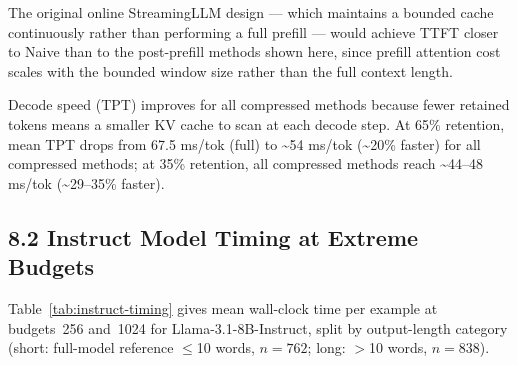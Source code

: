 \documentclass[10pt,letterpaper]{article}
\begin{document}
The original online StreamingLLM design --- which
maintains a bounded cache continuously rather than performing a full
prefill --- would achieve TTFT closer to Naive than to the post-prefill
methods shown here, since prefill attention cost scales with the bounded
window size rather than the full context length.

Decode speed (TPT) improves for all compressed methods because
fewer retained tokens means a smaller KV cache to scan at each decode
step. At 65\% retention, mean TPT drops from 67.5 ms/tok (full) to
\textasciitilde54 ms/tok (\textasciitilde20\% faster) for all compressed
methods; at 35\% retention, all compressed methods reach
\textasciitilde44--48 ms/tok (\textasciitilde29--35\% faster).

\subsection{8.2 Instruct Model Timing at Extreme Budgets}\label{instruct-model-timing}

Table~\ref{tab:instruct-timing} gives mean wall-clock time per example at budgets~256 and~1024 for Llama-3.1-8B-Instruct, split by output-length category (short: full-model reference $\leq$10 words, $n=762$; long: $>$10 words, $n=838$).
\end{document}

